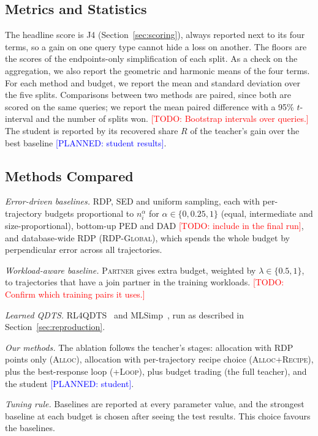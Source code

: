 \documentclass[conference]{IEEEtran}
\newcommand{\todo}[1]{\textcolor{red}{[TODO: #1]}}
\newcommand{\planned}[1]{\textcolor{blue}{[PLANNED: #1]}}
\begin{document}
\subsection{Metrics and Statistics}
\label{sec:statistics}

The headline score is J4 (Section~\ref{sec:scoring}), always reported next to its four terms, so a
gain on one query type cannot hide a loss on another. The floors are the scores of the
endpoints-only simplification of each split. As a check on the aggregation, we also report the
geometric and harmonic means of the four terms. For each method and budget, we report the mean and
standard deviation over the five splits. Comparisons between two methods are paired, since both are
scored on the same queries; we report the mean paired difference with a 95\% $t$-interval and the
number of splits won. \todo{Bootstrap intervals over queries.} The student is reported by its
recovered share $R$ of the teacher's gain over the best baseline \planned{student results}.

\subsection{Methods Compared}
\label{sec:baselines}

\emph{Error-driven baselines.} RDP, SED and uniform sampling, each with per-trajectory budgets
proportional to $n_i^{\alpha}$ for $\alpha \in \{0, 0.25, 1\}$ (equal, intermediate and
size-proportional), bottom-up PED and DAD \todo{include in the final run}, and database-wide RDP
(\textsc{RDP-Global}), which spends the whole budget by perpendicular error across all trajectories.

\emph{Workload-aware baseline.} \textsc{Partner} gives extra budget, weighted by
$\lambda \in \{0.5, 1\}$, to trajectories that have a join partner in the training workloads.
\todo{Confirm which training pairs it uses.}

\emph{Learned QDTS.} RL4QDTS~\cite{rl4qdts} and MLSimp~\cite{mlsimp}, run as described in
Section~\ref{sec:reproduction}.

\emph{Our methods.} The ablation follows the teacher's stages: allocation with RDP points only
(\textsc{Alloc}), allocation with per-trajectory recipe choice (\textsc{Alloc+Recipe}), plus the
best-response loop (\textsc{+Loop}), plus budget trading (the full teacher), and the student
\planned{student}.

\emph{Tuning rule.} Baselines are reported at every parameter value, and the strongest baseline at
each budget is chosen after seeing the test results. This choice favours the baselines.
\end{document}
